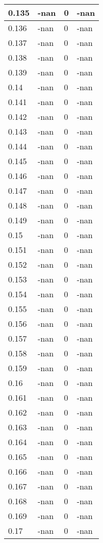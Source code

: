 \documentclass[a4paper,14pt]{extarticle}
\begin{document}
\begin{longtable}{||m{3cm}||m{3cm}|m{3cm}||m{3cm}||}
\hline
0.135 & -nan & 0 & -nan\\
\hline
0.136 & -nan & 0 & -nan\\
\hline
0.137 & -nan & 0 & -nan\\
\hline
0.138 & -nan & 0 & -nan\\
\hline
0.139 & -nan & 0 & -nan\\
\hline
0.14 & -nan & 0 & -nan\\
\hline
0.141 & -nan & 0 & -nan\\
\hline
0.142 & -nan & 0 & -nan\\
\hline
0.143 & -nan & 0 & -nan\\
\hline
0.144 & -nan & 0 & -nan\\
\hline
0.145 & -nan & 0 & -nan\\
\hline
0.146 & -nan & 0 & -nan\\
\hline
0.147 & -nan & 0 & -nan\\
\hline
0.148 & -nan & 0 & -nan\\
\hline
0.149 & -nan & 0 & -nan\\
\hline
0.15 & -nan & 0 & -nan\\
\hline
0.151 & -nan & 0 & -nan\\
\hline
0.152 & -nan & 0 & -nan\\
\hline
0.153 & -nan & 0 & -nan\\
\hline
0.154 & -nan & 0 & -nan\\
\hline
0.155 & -nan & 0 & -nan\\
\hline
0.156 & -nan & 0 & -nan\\
\hline
0.157 & -nan & 0 & -nan\\
\hline
0.158 & -nan & 0 & -nan\\
\hline
0.159 & -nan & 0 & -nan\\
\hline
0.16 & -nan & 0 & -nan\\
\hline
0.161 & -nan & 0 & -nan\\
\hline
0.162 & -nan & 0 & -nan\\
\hline
0.163 & -nan & 0 & -nan\\
\hline
0.164 & -nan & 0 & -nan\\
\hline
0.165 & -nan & 0 & -nan\\
\hline
0.166 & -nan & 0 & -nan\\
\hline
0.167 & -nan & 0 & -nan\\
\hline
0.168 & -nan & 0 & -nan\\
\hline
0.169 & -nan & 0 & -nan\\
\hline
0.17 & -nan & 0 & -nan\\

\end{longtable}
\end{document}
